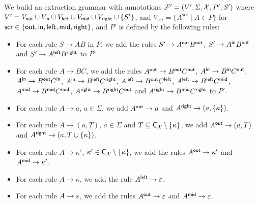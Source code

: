 We build an extraction grammar with annotations $\mathcal{F}' = (V', \Sigma, \mathcal{X}, P', S')$ where $V' = V_{\mathsf{out}} \cup V_{\mathsf{in}} \cup V_{\mathsf{left}} \cup V_{\mathsf{mid}} \cup V_{\mathsf{right}}\cup\{S'\}$, and $V_\mathsf{scr} = \{A^\mathsf{scr} \mid A\in P\}$ for $\mathsf{scr}\in\{\mathsf{out}, \mathsf{in}, \mathsf{left}, \mathsf{mid}, \mathsf{right}\}$, and $P'$ is defined by the following rules:
\begin{itemize}
	\item For each rule $S\to AB$ in $P$, we add the rules $S'\to A^{\mathsf{out}}B^{\mathsf{out}}$, $S'\to A^{\mathsf{in}}B^{\mathsf{out}}$ and $S'\to A^{\mathsf{left}}B^{\mathsf{right}}$ to $P'$.
	\item For each rule $A\to BC$, we add the rules $A^{\mathsf{out}} \to B^{\mathsf{out}}C^{\mathsf{out}}$, $A^{\mathsf{in}}\to B^{\mathsf{in}}C^{\mathsf{out}}$, $A^{\mathsf{in}}\to B^{\mathsf{out}}C^{\mathsf{in}}$, $A^{\mathsf{in}}\to B^{\mathsf{left}}C^{\mathsf{right}}$, $A^{\mathsf{left}}\to B^{\mathsf{out}}C^{\mathsf{left}}$, $A^{\mathsf{left}}\to B^{\mathsf{left}}C^{\mathsf{mid}}$, $A^{\mathsf{mid}}\to B^{\mathsf{mid}}C^{\mathsf{mid}}$, $A^{\mathsf{right}}\to B^{\mathsf{right}}C^{\mathsf{out}}$ and $A^{\mathsf{right}}\to B^{\mathsf{mid}}C^{\mathsf{right}}$ to $P'$.
	\item For each rule $A\to a$, $a\in \Sigma$, we add $A^{\mathsf{out}}\to a$ and $A^{\mathsf{right}}\to(a, \{\kappa\})$.
\item For each rule $A\to (a, T)$, $a\in \Sigma$ and $T\subseteq\textsf{C}_{\mathcal{X}}\setminus\{\kappa\}$, we add $A^{\mathsf{out}}\to (a, T)$ and $A^{\mathsf{right}}\to(a, T\cup\{\kappa\})$.
\item For each rule $A\to \kappa'$, $\kappa'\in\textsf{C}_{\mathcal{X}}\setminus\{\kappa\}$, we add the rules $A^{\mathsf{out}}\to\kappa'$ and $A^{\mathsf{mid}}\to\kappa'$.
\item For each rule $A\to \kappa$, we add the rule $A^{\mathsf{left}}\to\varepsilon$.
\item For each rule $A\to\varepsilon$, we add the rules $A^{\mathsf{out}}\to\varepsilon$ and $A^{\mathsf{mid}}\to\varepsilon$.
\end{itemize}

%

